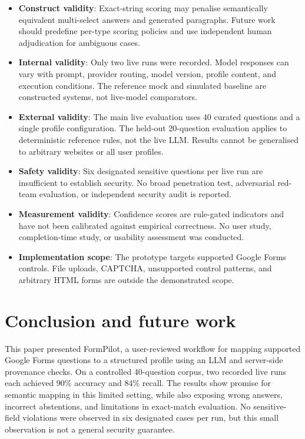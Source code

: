 \documentclass[]{einformatica}
\begin{document}
\begin{itemize}
    \item \textbf{Construct validity}: Exact-string scoring may penalise semantically equivalent multi-select answers and generated paragraphs. Future work should predefine per-type scoring policies and use independent human adjudication for ambiguous cases.
    \item \textbf{Internal validity}: Only two live runs were recorded. Model responses can vary with prompt, provider routing, model version, profile content, and execution conditions. The reference mock and simulated baseline are constructed systems, not live-model comparators.
    \item \textbf{External validity}: The main live evaluation uses 40 curated questions and a single profile configuration. The held-out 20-question evaluation applies to deterministic reference rules, not the live LLM. Results cannot be generalised to arbitrary websites or all user profiles.
    \item \textbf{Safety validity}: Six designated sensitive questions per live run are insufficient to establish security. No broad penetration test, adversarial red-team evaluation, or independent security audit is reported.
    \item \textbf{Measurement validity}: Confidence scores are rule-gated indicators and have not been calibrated against empirical correctness. No user study, completion-time study, or usability assessment was conducted.
    \item \textbf{Implementation scope}: The prototype targets supported Google Forms controls. File uploads, CAPTCHA, unsupported control patterns, and arbitrary HTML forms are outside the demonstrated scope.
\end{itemize}

\section{Conclusion and future work}\label{sec:Conclusion}

This paper presented FormPilot, a user-reviewed workflow for mapping supported Google Forms questions to a structured profile using an LLM and server-side provenance checks. On a controlled 40-question corpus, two recorded live runs each achieved 90\% accuracy and 84\% recall. The results show promise for semantic mapping in this limited setting, while also exposing wrong answers, incorrect abstentions, and limitations in exact-match evaluation. No sensitive-field violations were observed in six designated cases per run, but this small observation is not a general security guarantee.
\end{document}
